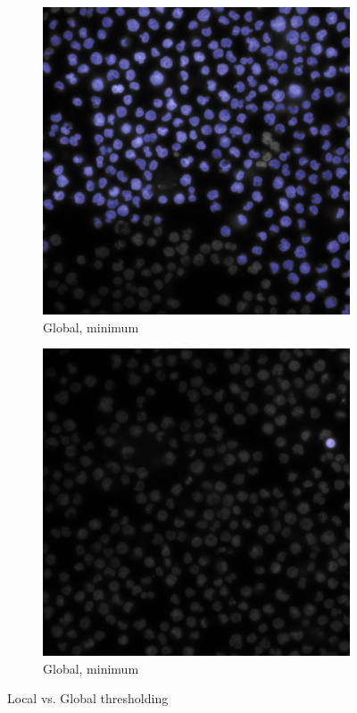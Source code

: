 \begin{figure}[ht]
    \begin{subfigure}[b]{0.5\linewidth}
      \centering
      \includegraphics[width=0.75\linewidth]{bilder/difficult-lightning/gradient_min.png} 
      \caption{Global, minimum} 
      \label{fig7:c} 
    \end{subfigure}%
    \begin{subfigure}[b]{0.5\linewidth}
      \centering
      \includegraphics[width=0.75\linewidth]{bilder/difficult-lightning/point_min.png} 
      \caption{Global, minimum} 
      \label{fig7:d} 
    \end{subfigure} 
    \caption{Local vs. Global thresholding}
    \label{fig7} 
\end{figure}


